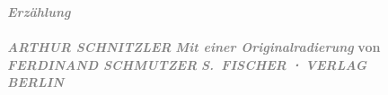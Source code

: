 \begin{ledgroupsized}[t]{13cm}
           \pstart
           \noindent{}\centering{}\textcolor{gray}{\textbf{\emph{Erzählung}}}{\\}\textcolor{gray}{\textbf{}}{\\}\textcolor{gray}{\textbf{\emph{ARTHUR SCHNITZLER}}}\pend
           \pstart
           \noindent{}\centering{}\textcolor{gray}{\textbf{\emph{Mit einer Originalradierung}}}\pend
           \pstart
           \noindent{}\centering{}\textcolor{gray}{\textbf{von}}{\\}\textcolor{gray}{\textbf{\emph{FERDINAND SCHMUTZER}}}\pend
           {\bigskip}\pstart
           \noindent{}\centering{}\textcolor{gray}{\textbf{\emph{S. FISCHER ⋅ VERLAG}}}{\\}\textcolor{gray}{\textbf{\emph{BERLIN\label{K_L03614-1v}\label{K_L03614-1h}}}}\pend
           
         
         \endnumbering{}\end{ledgroupsized}  \newcommand{\dateiname}{L03614}\newcommand{\titel}{Arthur Schnitzler und Ferdinand Schmutzer: Widmungsexemplar Der blinde Geronimo und sein Bruder für Felix Salten, [29. 5. 1915?]}\newcommand{\editorInnen}{Martin Anton Müller und Laura Untner}
      